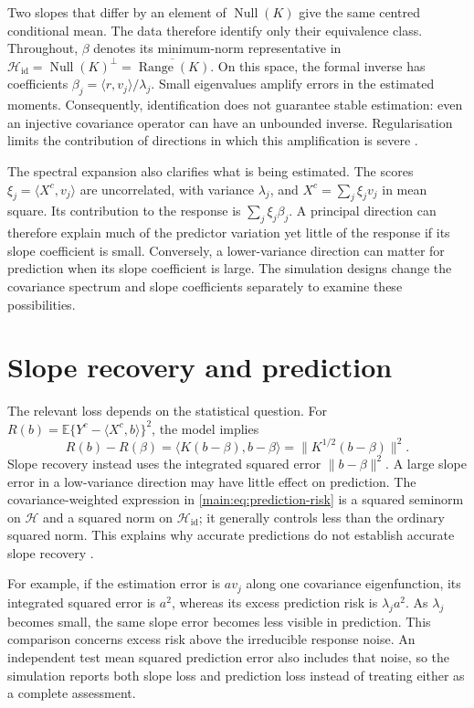 Two slopes that differ by an element of $\operatorname{Null}(K)$ give the
same centred conditional mean. The data therefore identify only their
equivalence class. Throughout, $\beta$ denotes its minimum-norm
representative in
$\mathcal H_{\mathrm{id}}=\operatorname{Null}(K)^\perp
=\overline{\operatorname{Range}(K)}$.
On this space, the formal inverse has coefficients
$\beta_j=\langle r,v_j\rangle/\lambda_j$. Small eigenvalues amplify errors
in the estimated moments. Consequently, identification does not guarantee
stable estimation: even an injective covariance operator can have an
unbounded inverse. Regularisation limits the contribution of directions in
which this amplification is severe
\parencite{engl_hanke_neubauer_1996,hall_horowitz_2007}.

The spectral expansion also clarifies what is being estimated. The scores
$\xi_j=\langle X^c,v_j\rangle$ are uncorrelated, with variance
$\lambda_j$, and $X^c=\sum_j\xi_jv_j$ in mean square. Its contribution
to the response is $\sum_j\xi_j\beta_j$. A principal direction can
therefore explain much of the predictor variation yet little of the
response if its slope coefficient is small. Conversely, a lower-variance
direction can matter for prediction when its slope coefficient is large.
The simulation designs change the covariance spectrum and slope
coefficients separately to examine these possibilities.

\section{Slope recovery and prediction}

The relevant loss depends on the statistical question. For
$R(b)=\mathbb E\{Y^c-\langle X^c,b\rangle\}^2$, the model implies
\begin{equation}
 R(b)-R(\beta)
 =\langle K(b-\beta),b-\beta\rangle
 =\|K^{1/2}(b-\beta)\|^2.
 \label{main:eq:prediction-risk}
\end{equation}
Slope recovery instead uses the integrated squared error $\|b-\beta\|^2$.
A large slope error in a low-variance direction may have little effect on
prediction. The covariance-weighted expression in
\eqref{main:eq:prediction-risk} is a squared seminorm on $\mathcal H$ and
a squared norm on $\mathcal H_{\mathrm{id}}$; it generally controls less
than the ordinary squared norm. This explains why accurate predictions do
not establish accurate slope recovery \parencite{cai_hall_2006}.

For example, if the estimation error is $av_j$ along one covariance
eigenfunction, its integrated squared error is $a^2$, whereas its excess
prediction risk is $\lambda_j a^2$. As $\lambda_j$ becomes small, the
same slope error becomes less visible in prediction. This comparison
concerns excess risk above the irreducible response noise. An independent
test mean squared prediction error also includes that noise, so the
simulation reports both slope loss and prediction loss instead of treating
either as a complete assessment.

